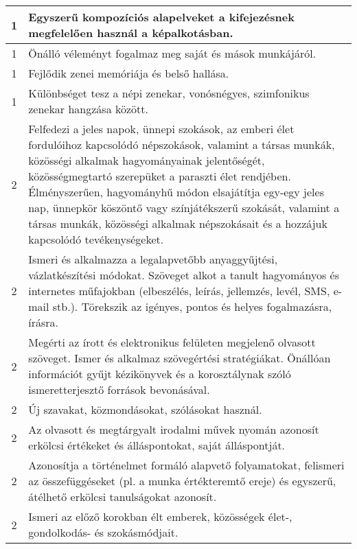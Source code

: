 \begin{longtable}{c | p{12cm} }
                                          1 &  Egyszerű kompozíciós alapelveket a kifejezésnek megfelelően használ a képalkotásban. \\ \hline
                                          1 &  Önálló véleményt fogalmaz meg saját és mások munkájáról. \\ \hline
                                          1 &  Fejlődik zenei memóriája és belső hallása. \\ \hline
                                          1 &  Különbséget tesz a népi zenekar, vonósnégyes, szimfonikus zenekar hangzása között. \\ \hline
                                      
                                
                                          2 &  Felfedezi a jeles napok, ünnepi szokások, az emberi élet fordulóihoz kapcsolódó népszokások, valamint a társas munkák, közösségi alkalmak hagyományainak jelentőségét, közösségmegtartó szerepüket a paraszti élet rendjében. Élményszerűen, hagyományhű módon elsajátítja egy-egy jeles nap, ünnepkör köszöntő vagy színjátékszerű szokását, valamint a társas munkák, közösségi alkalmak népszokásait és a hozzájuk kapcsolódó tevékenységeket. \\ \hline
                                          2 &  Ismeri és alkalmazza a legalapvetőbb anyaggyűjtési, vázlatkészítési módokat. Szöveget alkot a tanult hagyományos és internetes műfajokban (elbeszélés, leírás, jellemzés, levél, SMS, e-mail stb.). Törekszik az igényes, pontos és helyes fogalmazásra, írásra. \\ \hline
                                          2 &  Megérti az írott és elektronikus felületen megjelenő olvasott szöveget.
Ismer és alkalmaz szövegértési stratégiákat.
Önállóan információt gyűjt kézikönyvek és a korosztálynak szóló ismeretterjesztő források bevonásával. \\ \hline
                                          2 &  Új szavakat, közmondásokat, szólásokat használ. \\ \hline
                                          2 &  Az olvasott és megtárgyalt irodalmi művek nyomán azonosít erkölcsi értékeket és álláspontokat, saját álláspontját. \\ \hline
                                          2 &  Azonosítja a történelmet formáló alapvető folyamatokat, felismeri az összefüggéseket (pl. a munka értékteremtő ereje) és egyszerű, átélhető erkölcsi tanulságokat azonosít. \\ \hline
                                          2 &  Ismeri az előző korokban élt emberek, közösségek élet-, gondolkodás- és szokásmódjait. \\ \hline

\end{longtable}
